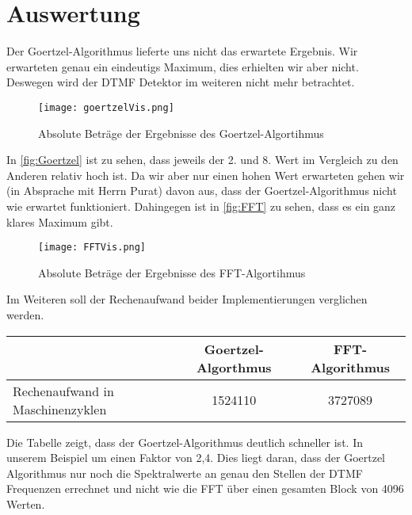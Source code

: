 \section{Auswertung}
Der Goertzel-Algorithmus lieferte uns nicht das erwartete Ergebnis. Wir erwarteten genau ein eindeutigs Maximum, dies erhielten wir aber nicht. Deswegen wird der DTMF Detektor im weiteren nicht mehr betrachtet.
\begin{figure}[H]
	\texttt{[image: goertzelVis.png]}
  \caption{Absolute Beträge der Ergebnisse des Goertzel-Algortihmus}
  \label{fig:Goertzel}
\end{figure}
In \autoref{fig:Goertzel} ist zu sehen, dass jeweils der 2. und 8. Wert im Vergleich zu den Anderen relativ hoch ist. Da wir aber nur einen hohen Wert erwarteten gehen wir (in Absprache mit Herrn Purat) davon aus, dass der Goertzel-Algorithmus nicht wie erwartet funktioniert.
Dahingegen ist in \autoref{fig:FFT} zu sehen, dass es ein ganz klares Maximum gibt.
\begin{figure}[H]
	\texttt{[image: FFTVis.png]}
  \caption{Absolute Beträge der Ergebnisse des FFT-Algortihmus}
  \label{fig:FFT}
\end{figure}
Im Weiteren soll der Rechenaufwand beider Implementierungen verglichen werden.
\begin{center}
	\begin{tabular}{l|c|c}
	 & Goertzel-Algorthmus & FFT-Algorithmus \\ \hline
	 Rechenaufwand in Maschinenzyklen & 1524110 & 3727089
	\end{tabular}
\end{center} 
Die Tabelle zeigt, dass der Goertzel-Algorithmus deutlich schneller ist. In unserem Beispiel um einen Faktor von 2,4. Dies liegt daran, dass der Goertzel Algorithmus nur noch die Spektralwerte an genau den Stellen der DTMF Frequenzen errechnet und nicht wie die FFT über einen gesamten Block von 4096 Werten.

